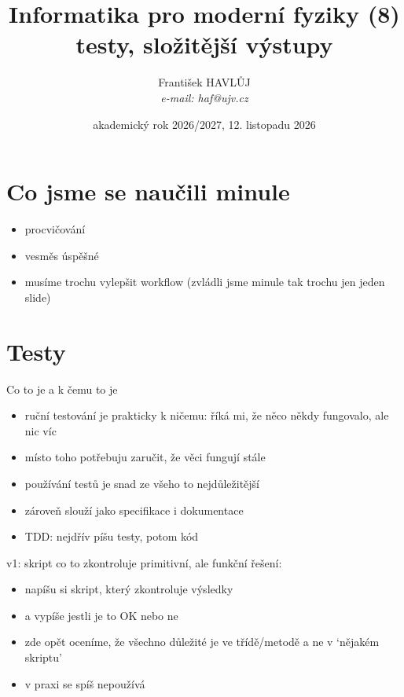 \documentclass{beamer}
\title[IMF (8)]{Informatika pro moderní fyziky (8)\\testy, složitější výstupy}
\author[Franti\v{s}ek HAVL\r{U}J, ORF ÚJV Řež]{Franti\v{s}ek HAVL\r{U}J\\{\scriptsize \emph{e-mail: haf@ujv.cz}}}
\date{akademický rok 2026/2027, 12. listopadu 2026}
\institute[ORF ÚJV Řež]
{ÚJV Řež\\oddělení Reaktorové fyziky a podpory palivového cyklu}
\begin{document}
\begin{frame}
  \titlepage
\end{frame}

\begin{frame}
  \tableofcontents
\end{frame}

\section{Co jsme se naučili minule}

\begin{frame}{}
  \begin{itemize}
    \item procvičování
    \item vesměs úspěšné
    \item musíme trochu vylepšit workflow (zvládli jsme minule tak trochu jen jeden slide)  
  \end{itemize}
\end{frame}

\section{Testy}

\begin{frame}{Co to je a k čemu to je}
  \begin{itemize}
    \item ruční testování je prakticky k ničemu: říká mi, že něco někdy fungovalo, ale nic víc
    \item místo toho potřebuju zaručit, že věci fungují stále
    \item používání testů je snad ze všeho to nejdůležitější
    \item zároveň slouží jako specifikace i dokumentace
    \item TDD: nejdřív píšu testy, potom kód 
  \end{itemize}
\end{frame}

\begin{frame}{v1: skript co to zkontroluje}
  primitivní, ale funkční řešení:
  \begin{itemize}
    \item napíšu si skript, který zkontroluje výsledky
    \item a vypíše jestli je to OK nebo ne
    \item zde opět oceníme, že všechno důležité je ve třídě/metodě a ne v `nějakém skriptu'
    \item v praxi se spíš nepoužívá
  \end{itemize}
\end{frame}
\end{document}
